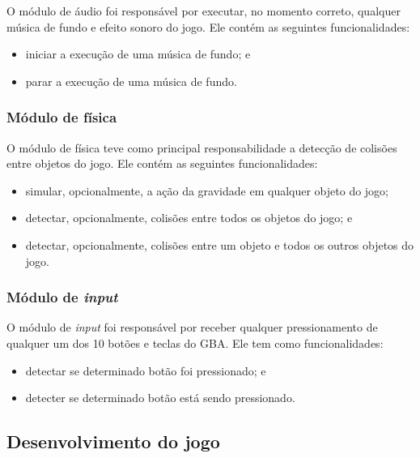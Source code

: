       O módulo de áudio foi responsável por executar, no momento correto, qualquer música de fundo e efeito sonoro do jogo. Ele contém as seguintes funcionalidades:

      \begin{itemize}
        \item iniciar a execução de uma música de fundo; e
        \item parar a execução de uma música de fundo.
      \end{itemize}

    \subsubsection{Módulo de física}

      O módulo de física teve como principal responsabilidade a detecção de colisões entre objetos do jogo. Ele contém as seguintes funcionalidades:

      \begin{itemize}
        \item simular, opcionalmente, a ação da gravidade em qualquer objeto do jogo;
        \item detectar, opcionalmente, colisões entre todos os objetos do jogo; e
        \item detectar, opcionalmente, colisões entre um objeto e todos os outros objetos do jogo.
      \end{itemize}

    \subsubsection{Módulo de \textit{input}}

      O módulo de \textit{input} foi responsável por receber qualquer pressionamento de qualquer um dos 10 botões e teclas do GBA. Ele tem como funcionalidades:

      \begin{itemize}
        \item detectar se determinado botão foi pressionado; e
        \item detecter se determinado botão está sendo pressionado.
      \end{itemize}

  \subsection{Desenvolvimento do jogo}

